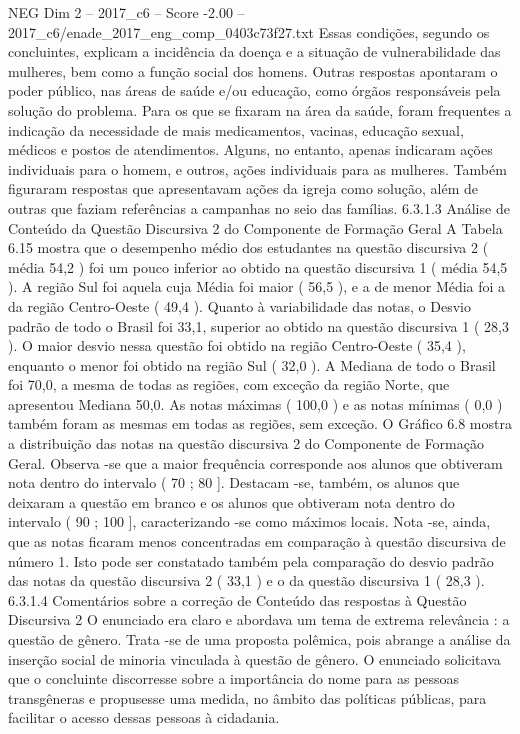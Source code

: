 \begin{textsample}{NEG Dim 2 – 2017\_c6 – Score -2.00 – 2017\_c6/enade\_2017\_eng\_comp\_0403c73f27.txt}
Essas condições, segundo os concluintes, explicam a incidência da doença e a situação de vulnerabilidade das mulheres, bem como a função social dos homens.
Outras respostas apontaram o poder público, nas áreas de saúde e/ou educação, como órgãos responsáveis pela solução do problema.
Para os que se fixaram na área da saúde, foram frequentes a indicação da necessidade de mais medicamentos, vacinas, educação sexual, médicos e postos de atendimentos.
Alguns, no entanto, apenas indicaram ações individuais para o homem, e outros, ações individuais para as mulheres.
Também figuraram respostas que apresentavam ações da igreja como solução, além de outras que faziam referências a campanhas no seio das famílias. 6.3.1.3 Análise de Conteúdo da Questão Discursiva 2 do Componente de Formação Geral A Tabela 6.15 mostra que o desempenho médio dos estudantes na questão discursiva 2 ( média 54,2 ) foi um pouco inferior ao obtido na questão discursiva 1 ( média 54,5 ).
A região Sul foi aquela cuja Média foi maior ( 56,5 ), e a de menor Média foi a da região Centro-Oeste ( 49,4 ).
Quanto à variabilidade das notas, o Desvio padrão de todo o Brasil foi 33,1, superior ao obtido na questão discursiva 1 ( 28,3 ).
O maior desvio nessa questão foi obtido na região Centro-Oeste ( 35,4 ), enquanto o menor foi obtido na região Sul ( 32,0 ).
A Mediana de todo o Brasil foi 70,0, a mesma de todas as regiões, com exceção da região Norte, que apresentou Mediana 50,0.
As notas máximas ( 100,0 ) e as notas mínimas ( 0,0 ) também foram as mesmas em todas as regiões, sem exceção.
O Gráfico 6.8 mostra a distribuição das notas na questão discursiva 2 do Componente de Formação Geral.
Observa -se que a maior frequência corresponde aos alunos que obtiveram nota dentro do intervalo ( 70 ; 80 ].
Destacam -se, também, os alunos que deixaram a questão em branco e os alunos que obtiveram nota dentro do intervalo ( 90 ; 100 ], caracterizando -se como máximos locais.
Nota -se, ainda, que as notas ficaram menos concentradas em comparação à questão discursiva de número 1.
Isto pode ser constatado também pela comparação do desvio padrão das notas da questão discursiva 2 ( 33,1 ) e o da questão discursiva 1 ( 28,3 ). 6.3.1.4 Comentários sobre a correção de Conteúdo das respostas à Questão Discursiva 2 O enunciado era claro e abordava um tema de extrema relevância : a questão de gênero.
Trata -se de uma proposta polêmica, pois abrange a análise da inserção social de minoria vinculada à questão de gênero.
O enunciado solicitava que o concluinte discorresse sobre a importância do nome para as pessoas transgêneras e propusesse uma medida, no âmbito das políticas públicas, para facilitar o acesso dessas pessoas à cidadania.

\end{textsample}
